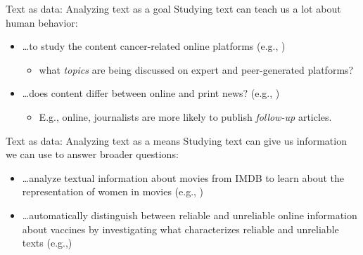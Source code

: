 \documentclass[handout]{beamer}
\begin{document}
\begin{frame}{Text as data: Analyzing text as a goal}
	Studying text can teach us a lot about human behavior:
	\begin{itemize}[<+->]
	\item \dots to study the content cancer-related online platforms (e.g., \cite{sanders_different_2020})
	\begin{itemize}
	\item what \emph{topics} are being discussed on expert and peer-generated platforms?
	\end{itemize}
	\item \dots does content differ between online and print news? (e.g., \cite{burggraaff_through_2020})
	\begin{itemize}
	\item E.g., online, journalists are more likely to publish \emph{follow-up} articles.
	\end{itemize}
	\end{itemize}
\end{frame}
	
\begin{frame}{Text as data: Analyzing text as a means}
Studying text can give us information we can use to answer broader questions: 
\begin{itemize}[<+->]
	\item \dots analyze textual information about movies from IMDB to learn about the representation of women in movies (e.g.,\cite{poma-murialdo_gender_2019} )
	\item \dots automatically distinguish between reliable and unreliable online information about vaccines 
	by investigating what characterizes reliable and unreliable texts (e.g.,\cite{meppelink_reliable_2021})
\end{itemize}
\end{frame}
\end{document}
